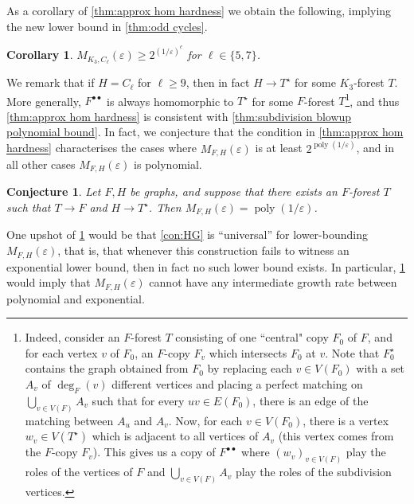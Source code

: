 \documentclass[reqno, english, 12pt]{amsart}
\theoremstyle{plain}
\newtheorem{corollary}[theorem]{Corollary}
\newtheorem{conjecture}[theorem]{Conjecture}
\theoremstyle{remark}
\DeclareMathOperator{\poly}{poly}
\renewcommand{\geq}{\geqslant}
\newcommand{\e}{\ensuremath{\varepsilon}}
\begin{document}
As a corollary of \cref{thm:approx hom hardness} we obtain the following, implying the new lower bound in \cref{thm:odd cycles}.

\begin{corollary}\label{cor:C5 C7}
	$M_{K_3,C_\ell}(\e) \geq 2^{(1/\varepsilon)^c}$ for $\ell \in \{5,7\}$.
\end{corollary}
We remark that if $H=C_\ell$ for $\ell \geq 9$, then in fact $H \to T^\star$ for some $K_3$-forest $T$. More generally, $F^{\bullet\bullet}$ is always homomorphic to $T^\star$ for some $F$-forest $T$\footnote{Indeed, consider an $F$-forest $T$ consisting of one ``central" copy $F_0$ of $F$, and for each vertex $v$ of $F_0$, an $F$-copy $F_v$ which intersects $F_0$ at $v$. Note that $F^\star_0$ contains the graph obtained from $F_0$ by replacing each $v \in V(F_0)$ with a set $A_v$ of $\deg_F(v)$ different vertices and placing a perfect matching on $\bigcup_{v \in V(F)}A_v$ such that for every $uv \in E(F_0)$, there is an edge of the matching between $A_u$ and $A_v$. Now, for each $v \in V(F_0)$, there is a vertex $w_v \in V(T^\star)$ which is adjacent to all vertices of $A_v$ (this vertex comes from the $F$-copy $F_v$). This gives us a copy of $F^{\bullet\bullet}$ where $(w_v)_{v \in V(F)}$ play the roles of the vertices of $F$ and $\bigcup_{v \in V(F)}A_v$ play the roles of the subdivision vertices.}, and thus \cref{thm:approx hom hardness} is consistent with \cref{thm:subdivision blowup polynomial bound}. 
In fact, we conjecture that the condition in \cref{thm:approx hom hardness} characterises the cases where $M_{F,H}(\varepsilon)$ is at least $2^{\poly(1/\varepsilon)}$, and in all other cases $M_{F,H}(\varepsilon)$ \nolinebreak is \nolinebreak polynomial.
\begin{conjecture}\label{conj:approx homo characterization}
	Let $F,H$ be graphs, and suppose that there exists an $F$-forest $T$ such that $T\rightarrow F$ and $H\rightarrow T^{\star}$. Then $M_{F,H}(\varepsilon) = \poly(1/\varepsilon)$. 
\end{conjecture}
One upshot of \cref{conj:approx homo characterization} would be that \cref{con:HG} is ``universal'' for lower-bounding $M_{F,H}(\varepsilon)$, that is, that whenever this construction fails to witness an exponential lower bound, then in fact no such lower bound exists.
In particular, \cref{conj:approx homo characterization} would imply that $M_{F,H}(\varepsilon)$ cannot have any intermediate growth rate between polynomial and exponential. 
\end{document}
